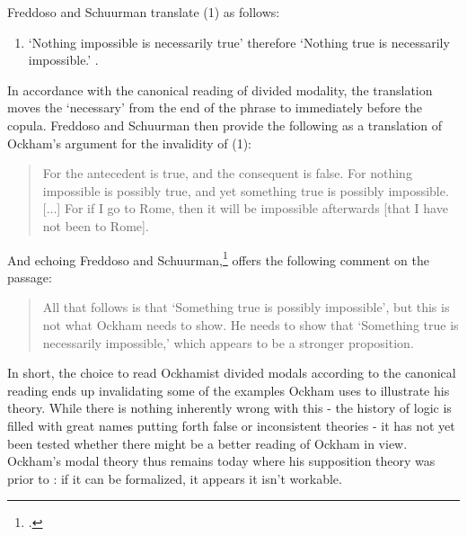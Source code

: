 \documentclass[a4paper]{article}
\begin{document}
\noindent Freddoso and Schuurman translate (1) as follows:
\begin{enumerate}
	\item[(1')]	`Nothing impossible is necessarily true' therefore `Nothing true is necessarily impossible.' \cite[p. 166]{OckhamSLEng}.
\end{enumerate}

\noindent In accordance with the canonical reading of divided modality, the translation moves the `necessary' from the end of the phrase to immediately before the copula. Freddoso and Schuurman then provide the following as a translation of Ockham's argument for the invalidity of (1):
\begin{quote}
For the antecedent is true, and the consequent is false. For nothing impossible is possibly true, and yet something true is possibly impossible. [...] For if I go to Rome, then it will be impossible afterwards [that I have not been to Rome]. \cite[p. 166]{OckhamSLEng}
\end{quote}

And echoing Freddoso and Schuurman,\footnote{\cite[p. 203, fn. 4]{OckhamSLEng}.} \cite{Johnston2015} offers the following comment on the passage: 

\begin{quote}
All that follows is that `Something true is possibly impossible', but this is not what Ockham needs to show. He needs to show that `Something true is necessarily impossible,' which appears to be a stronger proposition.  \cite[p. 243]{Johnston2015}
\end{quote}

In short, the choice to read Ockhamist divided modals according to the canonical reading ends up invalidating some of the examples Ockham uses to illustrate his theory. While there is nothing inherently wrong with this - the history of logic is filled with great names putting forth false or inconsistent theories - it has not yet been tested whether there might be a better reading of Ockham in view. Ockham's modal theory thus remains today where his supposition theory was prior to \cite{PriestRead1977}: if it can be formalized, it appears it isn't workable.
\end{document}
